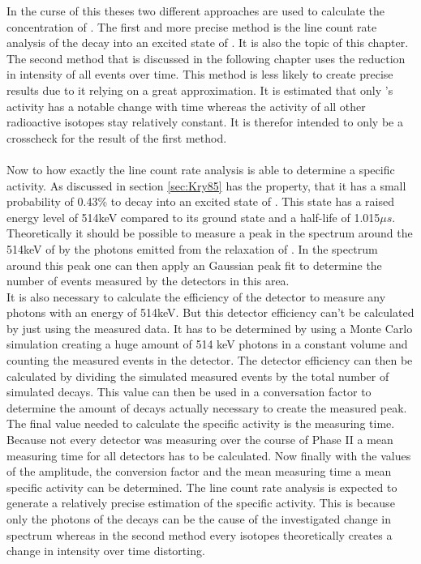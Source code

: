 In the curse of this theses two different approaches are used to calculate the concentration of \Kr. 
The first and more precise method is the line count rate analysis of the \Kr decay into an excited state of . 
It is also the topic of this chapter.
The second method that is discussed in the following chapter uses the reduction in intensity of all events over time. 
This method is less likely to create precise results due to it relying on a great approximation.
It is estimated that only \Kr's activity has a notable change with time whereas the activity of all other radioactive isotopes stay relatively constant. 
It is therefor intended to only be a crosscheck for the result of the first method.\\
\\

Now to how exactly the line count rate analysis is able to determine a specific activity.
As discussed in section \ref{sec:Kry85} has \Kr the property, that it has a small probability of 0.43\% to decay into an excited state of . 
This state has a raised energy level of 514keV compared to its ground state and a half-life of 1.015\(\unit{\mu s}\). 
Theoretically it should be possible to measure a peak in the spectrum around the 514keV of by the photons emitted from the relaxation of .
In the spectrum around this peak one can then apply an Gaussian peak fit to determine the number of events measured by the detectors in this area. 
\\

It is also necessary to calculate the efficiency of the detector to measure any photons with an energy of 514keV.
But this detector efficiency can't be calculated by just using the measured data.
It has to be determined by using a Monte Carlo simulation creating a huge amount of 514 keV photons in a constant volume and counting the measured events in the detector. 
The detector efficiency can then be calculated by dividing the simulated measured events by the total number of simulated decays.
This value can then be used in a conversation factor to determine the amount of decays actually necessary to create the measured peak.
\\

The final value needed to calculate the specific activity is the measuring time.
Because not every detector was measuring over the course of Phase II a mean measuring time for all detectors has to be calculated.
Now finally with the values of the amplitude, the conversion factor and the mean measuring time a mean specific activity can be determined. 
The line count rate analysis is expected to generate a relatively precise estimation of the specific activity.
This is because only the photons of the \Kr decays can be the cause of the investigated change in spectrum whereas in the second method every isotopes theoretically creates a change in intensity over time distorting.
\\ 

